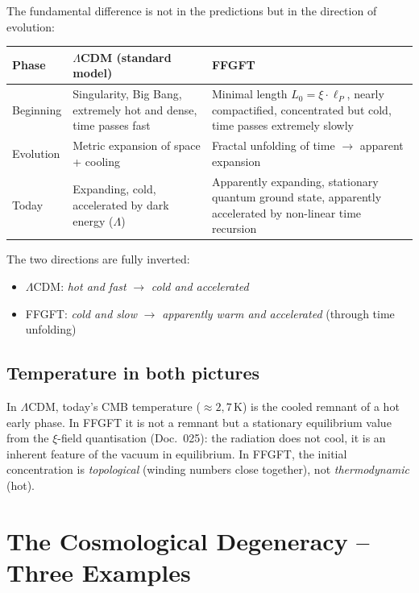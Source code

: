 The fundamental difference is not in the predictions but in the direction
of evolution:

\begin{center}
\begin{tabular}{p{2.3cm}p{5.3cm}p{5.3cm}}
\toprule
\textbf{Phase} & \textbf{$\Lambda$CDM (standard model)} & \textbf{FFGFT} \\
\midrule
Beginning &
  Singularity, Big Bang, extremely hot and dense, time passes fast &
  Minimal length $L_0 = \xi \cdot \ell_P$, nearly compactified,
  concentrated but cold, time passes extremely slowly \\
\addlinespace
Evolution &
  Metric expansion of space + cooling &
  Fractal unfolding of time $\to$ apparent expansion \\
\addlinespace
Today &
  Expanding, cold, accelerated by dark energy ($\Lambda$) &
  Apparently expanding, stationary quantum ground state, apparently
  accelerated by non-linear time recursion \\
\bottomrule
\end{tabular}
\end{center}

The two directions are fully inverted:
\begin{itemize}
  \item $\Lambda$CDM: \emph{hot and fast} $\to$ \emph{cold and accelerated}
  \item FFGFT: \emph{cold and slow} $\to$ \emph{apparently warm and accelerated}
        (through time unfolding)
\end{itemize}

\subsection*{Temperature in both pictures}

In $\Lambda$CDM, today's CMB temperature ($\approx 2{,}7$\,K) is the cooled
remnant of a hot early phase. In FFGFT it is not a remnant but a stationary
equilibrium value from the $\xi$-field quantisation (Doc.~025): the
radiation does not cool, it is an inherent feature of the vacuum in
equilibrium. In FFGFT, the initial concentration is \emph{topological}
(winding numbers close together), not \emph{thermodynamic} (hot).

\section{The Cosmological Degeneracy -- Three Examples}

